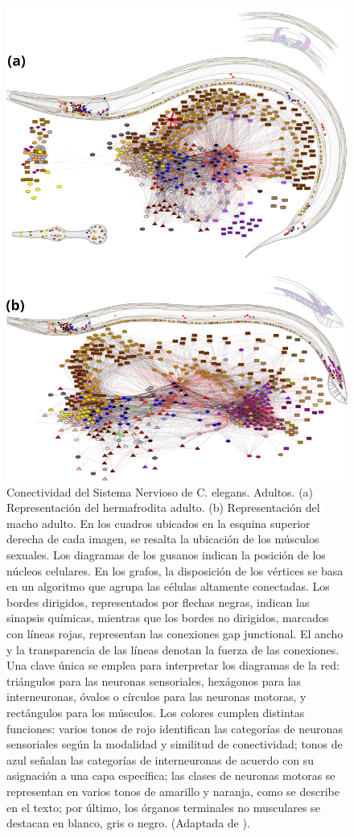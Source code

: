  \begin{figure}[h!]
	\centering\includegraphics[width=\imsize]{conectoma_b.png}
	\caption[Conectividad del Sistema Nervioso  de C. elegans. Adultos.]{ Conectividad del Sistema Nervioso  de C. elegans. Adultos. (a) Representación del hermafrodita adulto. (b) Representación del macho adulto. En los cuadros ubicados en la esquina superior derecha de cada imagen, se resalta la ubicación de los músculos sexuales. Los diagramas de los gusanos indican la posición de los núcleos celulares.  En los grafos, la disposición de los vértices se basa en un algoritmo que agrupa las células altamente conectadas. Los bordes dirigidos, representados por flechas negras, indican las sinapsis químicas, mientras que los bordes no dirigidos, marcados con líneas rojas, representan las conexiones gap junctional. El ancho y la transparencia de las líneas denotan la fuerza de las conexiones. Una clave única se emplea para interpretar los diagramas de la red: triángulos para las neuronas sensoriales, hexágonos para las interneuronas, óvalos o círculos para las neuronas motoras, y rectángulos para los músculos. Los colores cumplen distintas funciones: varios tonos de rojo identifican las categorías de neuronas sensoriales según la modalidad y similitud de conectividad; tonos de azul señalan las categorías de interneuronas de acuerdo con su asignación a una capa específica; las clases de neuronas motoras se representan en varios tonos de amarillo y naranja, como se describe en el texto; por último, los órganos terminales no musculares se destacan en blanco, gris o negro.  (Adaptada de \protect\cite{cook_whole-animal_2019}).}\label{fig:conectomaa}

\end{figure}
